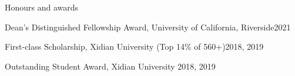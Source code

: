 \documentclass{resume} %
\begin{document}
\begin{rSection}{Honours and awards}
	\begin{rSubsection}{}{}{}{}
	    \item Dean's Distinguished Fellowship Award, University of California, Riverside\hfill {2021}
		\item First-class Scholarship, Xidian University (Top 14\% of 560+)\hfill {2018, 2019}
		\item Outstanding Student Award, Xidian University \hfill {2018, 2019}
	\end{rSubsection}
\end{rSection}

\end{document}
